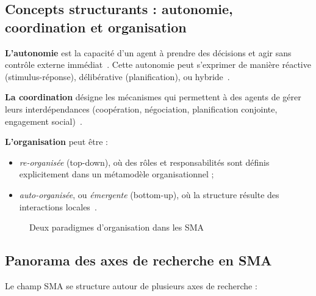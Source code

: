 \documentclass[ twoside,openright,titlepage,numbers=noenddot,headinclude,%
                footinclude=true,cleardoublepage=empty,abstractoff, %
                BCOR=5mm,paper=a4,fontsize=11pt,%
                french,american,%
                ]{scrreprt}
\begin{document}
\subsection*{Concepts structurants : autonomie, coordination et organisation}

\textbf{L'autonomie} est la capacité d'un agent à prendre des décisions et agir sans contrôle externe immédiat~\cite{Russell2010}. Cette autonomie peut s'exprimer de manière réactive (stimulus-réponse), délibérative (planification), ou hybride~\cite{Georgeff1999}.

\textbf{La coordination} désigne les mécanismes qui permettent à des agents de gérer leurs interdépendances (coopération, négociation, planification conjointe, engagement social)~\cite{Durfee1999,Jennings1996,Sandholm1999}.

\textbf{L'organisation} peut être :
\begin{itemize}
    \item \emph{re-organisée} (top-down), où des rôles et responsabilités sont définis explicitement dans un métamodèle organisationnel ;
    \item \emph{auto-organisée}, ou \emph{émergente} (bottom-up), où la structure résulte des interactions locales~\cite{Heylighen2001,DiMarzoSerugendo2005}.
\end{itemize}

\begin{figure}[h]
    \centering
    \caption{Deux paradigmes d'organisation dans les SMA}
    \label{fig:auto_vs_topdown}
\end{figure}

\subsection*{Panorama des axes de recherche en SMA}

Le champ SMA se structure autour de plusieurs axes de recherche :
\end{document}
